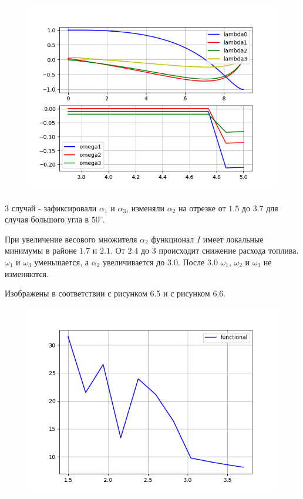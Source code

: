 \documentclass[14pt]{extreport}
\begin{document}
\begin{figure}[H]
\center\includegraphics[scale=0.7]{fig/ivp_and_control_3_7-5_5.png}
\caption{}
\end{figure}

3 случай - зафиксировали $\alpha_1$ и $\alpha_3$, изменяли $\alpha_2$ на отрезке от $1.5$ до $3.7$ для случая большого угла в $50^{\circ}$.

При увеличение весового множителя $\alpha_2$ функционал $I$ имеет локальные минимумы в районе $1.7$ и $2.1$. От $2.4$ до $3$ происходит снижение расхода топлива. $\omega_1$ и $\omega_3$ уменьшается, а $\alpha_2$ увеличивается до $3.0$. После $3.0$ $\omega_1$, $\omega_2$ и $\omega_3$ не изменяются.

Изображены в соответствии с рисунком 6.5 и с рисунком 6.6.

\begin{figure}[H]
\center\includegraphics[scale=0.7]{fig/functional_alpha2_1_5-3_7_50.png}
\caption{}
\end{figure}
\end{document}
